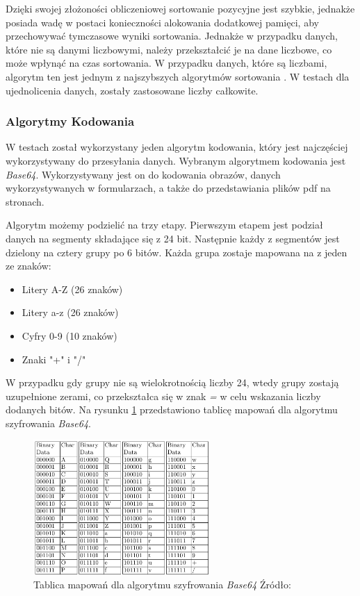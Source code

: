 Dzięki swojej złożoności obliczeniowej sortowanie pozycyjne jest szybkie, jednakże posiada wadę w postaci konieczności alokowania dodatkowej pamięci, aby przechowywać tymczasowe wyniki sortowania. Jednakże w przypadku danych, które nie są danymi liczbowymi, należy przekształcić je na dane liczbowe, co może wpłynąć na czas sortowania. W przypadku danych, które są liczbami, algorytm ten jest jednym z najszybszych algorytmów sortowania \cite{sorting}. W testach dla ujednolicenia danych, zostały zastosowane liczby całkowite.

\subsubsection{Algorytmy Kodowania}
W testach został wykorzystany jeden algorytm kodowania, który jest najczęściej wykorzystywany do przesyłania danych. Wybranym algorytmem kodowania jest \textit{Base64}. Wykorzystywany jest on do kodowania obrazów, danych wykorzystywanych w formularzach, a także do przedstawiania plików pdf na stronach.

Algorytm możemy podzielić na trzy etapy. Pierwszym etapem jest podział danych na segmenty składające się z 24 bit. Następnie każdy z segmentów jest dzielony na cztery grupy po 6 bitów. Każda grupa zostaje mapowana na z jeden ze znaków:
\begin{itemize}
  \item Litery A-Z (26 znaków)
  \item Litery a-z (26 znaków)
  \item Cyfry 0-9 (10 znaków)
  \item Znaki "+" i "/"
\end{itemize}
W przypadku gdy grupy nie są wielokrotnością liczby 24, wtedy grupy zostają uzupełnione zerami, co przekształca się w znak \textit{=} w celu wskazania liczby dodanych bitów. Na rysunku \ref{fig:base64_mapping_table} przedstawiono tablicę mapowań dla algorytmu szyfrowania \textit{Base64}.

\begin{figure}[H]
  \centering
  \includegraphics[width=0.6\textwidth]{Figures/base64_mapping_table.png}
  \caption{Tablica mapowań dla algorytmu szyfrowania \textit{Base64} Źródło: \cite{cryptoeprint:2022/361}}
  \label{fig:base64_mapping_table}
\end{figure}

